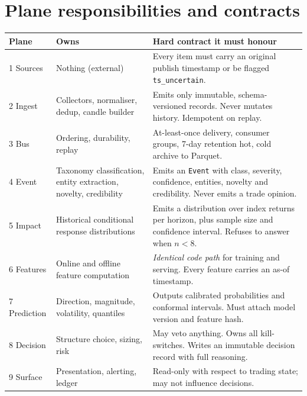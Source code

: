\begin{center}
\end{center}

\section{Plane responsibilities and contracts}

\begin{longtable}{@{}p{2.2cm}p{5.4cm}p{6.8cm}@{}}
\toprule
\textbf{Plane} & \textbf{Owns} & \textbf{Hard contract it must honour}\\
\midrule
\endhead
1 Sources & Nothing (external) & Every item must carry an original publish
timestamp or be flagged \texttt{ts\_uncertain}.\\
2 Ingest & Collectors, normaliser, dedup, candle builder & Emits only immutable,
schema-versioned records. Never mutates history. Idempotent on replay.\\
3 Bus & Ordering, durability, replay & At-least-once delivery, consumer groups,
7-day retention hot, cold archive to Parquet.\\
4 Event & Taxonomy classification, entity extraction, novelty, credibility &
Emits an \texttt{Event} with class, severity, confidence, entities, novelty and
credibility. Never emits a trade opinion.\\
5 Impact & Historical conditional response distributions & Emits a distribution
over index returns per horizon, plus sample size and confidence interval.
Refuses to answer when $n < 8$.\\
6 Features & Online and offline feature computation & \emph{Identical code path}
for training and serving. Every feature carries an as-of timestamp.\\
7 Prediction & Direction, magnitude, volatility, quantiles & Outputs calibrated
probabilities and conformal intervals. Must attach model version and feature
hash.\\
8 Decision & Structure choice, sizing, risk & May veto anything. Owns all
kill-switches. Writes an immutable decision record with full reasoning.\\
9 Surface & Presentation, alerting, ledger & Read-only with respect to trading
state; may not influence decisions.\\
\bottomrule
\end{longtable}

